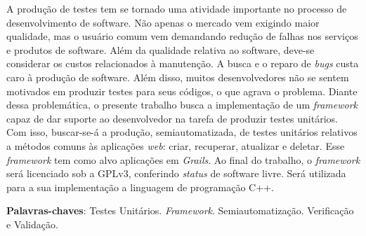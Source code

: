 \begin{resumo}
A produção de testes tem se tornado uma atividade importante no processo de desenvolvimento de software. Não apenas o mercado vem exigindo maior qualidade, mas o usuário comum vem demandando redução de falhas nos serviços e produtos de software. Além da qualidade relativa ao software, deve-se considerar os custos relacionados à manutenção. A busca e o reparo de \textit{bugs} custa caro à produção de software. Além disso, muitos desenvolvedores não se sentem motivados em produzir testes para seus códigos, o que agrava o problema. Diante dessa problemática, o presente trabalho busca a implementação de um \textit{framework} capaz de dar suporte ao desenvolvedor na tarefa de produzir testes unitários. Com isso, buscar-se-á a produção, semiautomatizada, de testes unitários relativos a métodos comuns às aplicações \textit{web}: criar, recuperar, atualizar e deletar. Esse \textit{framework} tem como alvo aplicações em \textit{Grails}. Ao final do trabalho, o \textit{framework} será licenciado sob a GPLv3, conferindo \textit{status} de software livre. Será utilizada para a sua implementação a linguagem de programação C++.
\vspace{\onelineskip}
    
\noindent
\textbf{Palavras-chaves}: Testes Unitários. \textit{Framework}. Semiautomatização. Verificação e Validação.
\end{resumo}
